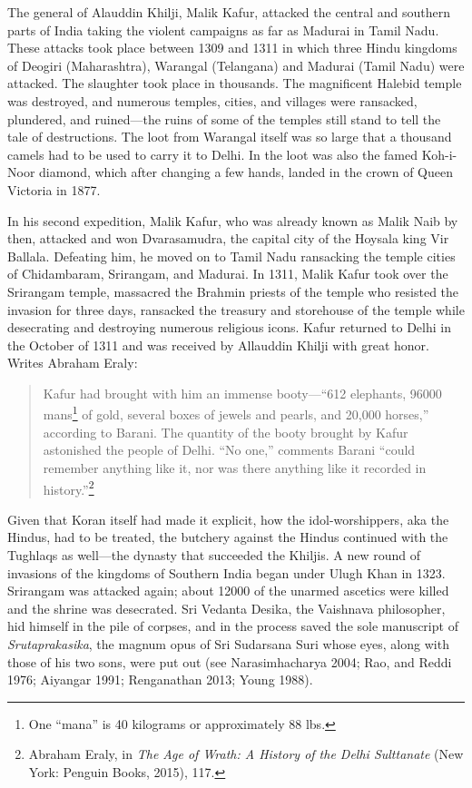 The general of Alauddin Khilji, Malik Kafur, attacked the central and southern parts of India taking the violent campaigns as far as Madurai in Tamil Nadu. These attacks took place between 1309 and 1311 in which three Hindu kingdoms of Deogiri (Maharashtra), Warangal (Telangana) and Madurai (Tamil Nadu) were attacked. The slaughter took place in thousands. The magnificent Halebid temple was destroyed, and numerous temples, cities, and villages were ransacked, plundered, and ruined—the ruins of some of the temples still stand to tell the tale of destructions. The loot from Warangal itself was so large that a thousand camels had to be used to carry it to Delhi. In the loot was also the famed Koh-i-Noor diamond, which after changing a few hands, landed in the crown of Queen Victoria in 1877.

In his second expedition, Malik Kafur, who was already known as Malik Naib by then, attacked and won Dvarasamudra, the capital city of the Hoysala king Vir Ballala. Defeating him, he moved on to Tamil Nadu ransacking the temple cities of Chidambaram, Srirangam, and Madurai. In 1311, Malik Kafur took over the Srirangam temple, massacred the Brahmin priests of the temple who resisted the invasion for three days, ransacked the treasury and storehouse of the temple while desecrating and destroying numerous religious icons. Kafur returned to Delhi in the October of 1311 and was received by Allauddin Khilji with great honor. Writes Abraham Eraly:
\begin{quote}
Kafur had brought with him an immense booty—“612 elephants, 96000 mans\footnote{One “mana” is 40 kilograms or approximately 88 lbs.} of gold, several boxes of jewels and pearls, and 20,000 horses,” according to Barani. The quantity of the booty brought by Kafur astonished the people of Delhi. “No one,” comments Barani “could remember anything like it, nor was there anything like it recorded in history.”\footnote{Abraham Eraly, in \textit{The Age of Wrath: A History of the Delhi Sulttanate} (New York: Penguin Books, 2015), 117.}
\end{quote}
Given that Koran itself had made it explicit, how the idol-worshippers, aka the Hindus, had to be treated, the butchery against the Hindus continued with the Tughlaqs as well—the dynasty that succeeded the Khiljis. A new round of invasions of the kingdoms of Southern India began under Ulugh Khan in 1323. Srirangam was attacked again; about 12000 of the unarmed ascetics were killed and the shrine was desecrated. Sri Vedanta Desika, the Vaishnava philosopher, hid himself in the pile of corpses, and in the process saved the sole manuscript of \textit{Srutaprakasika}, the magnum opus of Sri Sudarsana Suri whose eyes, along with those of his two sons, were put out (see Narasimhacharya 2004; Rao, and Reddi 1976; Aiyangar 1991; Renganathan 2013; Young 1988). 

